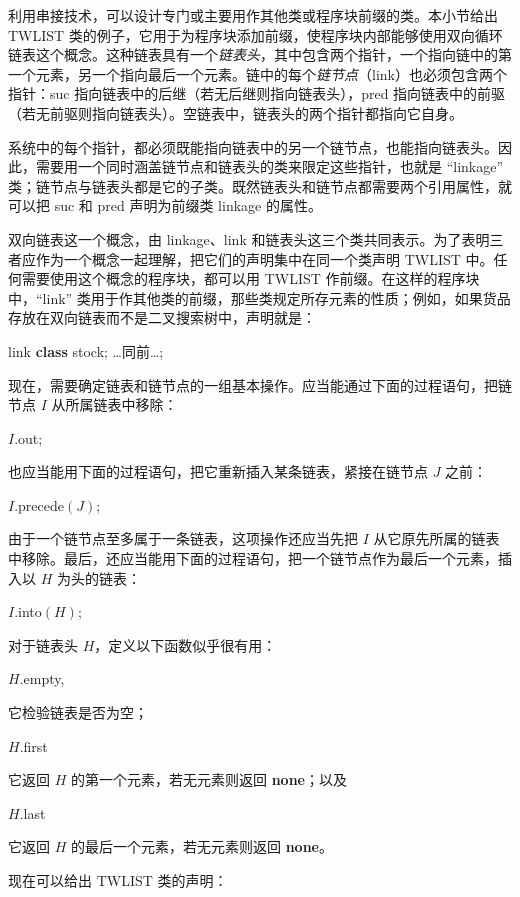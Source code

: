 \documentclass[twoside,11pt,fontset=none]{ctexbook}
\begin{document}
利用串接技术，可以设计专门或主要用作其他类或程序块前缀的类。本小节给出 TWLIST 类的例子，它用于为程序块添加前缀，使程序块内部能够使用双向循环链表这个概念。这种链表具有一个\textit{链表头}，其中包含两个指针，一个指向链中的第一个元素，另一个指向最后一个元素。链中的每个\textit{链节点}（link）也必须包含两个指针：suc 指向链表中的后继（若无后继则指向链表头），pred 指向链表中的前驱（若无前驱则指向链表头）。空链表中，链表头的两个指针都指向它自身。

系统中的每个指针，都必须既能指向链表中的另一个链节点，也能指向链表头。因此，需要用一个同时涵盖链节点和链表头的类来限定这些指针，也就是 ``linkage'' 类；链节点与链表头都是它的子类。既然链表头和链节点都需要两个引用属性，就可以把 suc 和 pred 声明为前缀类 linkage 的属性。

双向链表这一个概念，由 linkage、link 和链表头这三个类共同表示。为了表明三者应作为一个概念一起理解，把它们的声明集中在同一个类声明 TWLIST 中。任何需要使用这个概念的程序块，都可以用 TWLIST 作前缀。在这样的程序块中，``link'' 类用于作其他类的前缀，那些类规定所存元素的性质；例如，如果货品存放在双向链表而不是二叉搜索树中，声明就是：

\quad link \textbf{class} stock; \dots 同前\dots;

现在，需要确定链表和链节点的一组基本操作。应当能通过下面的过程语句，把链节点 $I$ 从所属链表中移除：

\quad $I$.out;

\noindent
也应当能用下面的过程语句，把它重新插入某条链表，紧接在链节点 $J$ 之前：

\quad $I$.precede$(J)$;

\noindent
由于一个链节点至多属于一条链表，这项操作还应当先把 $I$ 从它原先所属的链表中移除。最后，还应当能用下面的过程语句，把一个链节点作为最后一个元素，插入以 $H$ 为头的链表：

\quad $I$.into$(H)$;

对于链表头 $H$，定义以下函数似乎很有用：

\quad $H$.empty,

\noindent
它检验链表是否为空；

\quad $H$.first

\noindent
它返回 $H$ 的第一个元素，若无元素则返回 \textbf{none}；以及

\quad $H$.last

\noindent
它返回 $H$ 的最后一个元素，若无元素则返回 \textbf{none}。

现在可以给出 TWLIST 类的声明：
\end{document}
